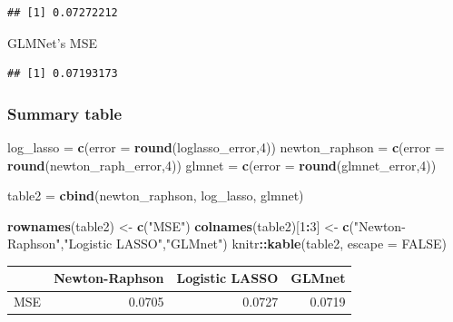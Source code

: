 \documentclass[]{article}
\newenvironment{Shaded}{\begin{snugshade}}{\end{snugshade}}
\newcommand{\KeywordTok}[1]{\textcolor[rgb]{0.13,0.29,0.53}{\textbf{#1}}}
\newcommand{\DataTypeTok}[1]{\textcolor[rgb]{0.13,0.29,0.53}{#1}}
\newcommand{\DecValTok}[1]{\textcolor[rgb]{0.00,0.00,0.81}{#1}}
\newcommand{\StringTok}[1]{\textcolor[rgb]{0.31,0.60,0.02}{#1}}
\newcommand{\OtherTok}[1]{\textcolor[rgb]{0.56,0.35,0.01}{#1}}
\newcommand{\OperatorTok}[1]{\textcolor[rgb]{0.81,0.36,0.00}{\textbf{#1}}}
\newcommand{\NormalTok}[1]{#1}
\begin{document}
\begin{verbatim}
## [1] 0.07272212
\end{verbatim}

GLMNet's MSE

\begin{Shaded}
\end{Shaded}

\begin{verbatim}
## [1] 0.07193173
\end{verbatim}

\subsubsection{Summary table}\label{summary-table}

\begin{Shaded}
\begin{Highlighting}[]
\NormalTok{log_lasso =}\StringTok{ }\KeywordTok{c}\NormalTok{(}\DataTypeTok{error =} \KeywordTok{round}\NormalTok{(loglasso_error,}\DecValTok{4}\NormalTok{))}
\NormalTok{newton_raphson =}\StringTok{ }\KeywordTok{c}\NormalTok{(}\DataTypeTok{error =} \KeywordTok{round}\NormalTok{(newton_raph_error,}\DecValTok{4}\NormalTok{))}
\NormalTok{glmnet =}\StringTok{ }\KeywordTok{c}\NormalTok{(}\DataTypeTok{error =} \KeywordTok{round}\NormalTok{(glmnet_error,}\DecValTok{4}\NormalTok{))}

\NormalTok{table2 =}\StringTok{ }\KeywordTok{cbind}\NormalTok{(newton_raphson, log_lasso, glmnet)}

\KeywordTok{rownames}\NormalTok{(table2) <-}\StringTok{ }\KeywordTok{c}\NormalTok{(}\StringTok{"MSE"}\NormalTok{)}
\KeywordTok{colnames}\NormalTok{(table2)[}\DecValTok{1}\OperatorTok{:}\DecValTok{3}\NormalTok{] <-}\StringTok{ }\KeywordTok{c}\NormalTok{(}\StringTok{"Newton-Raphson"}\NormalTok{,}\StringTok{"Logistic LASSO"}\NormalTok{,}\StringTok{"GLMnet"}\NormalTok{) }
\NormalTok{knitr}\OperatorTok{::}\KeywordTok{kable}\NormalTok{(table2, }\DataTypeTok{escape =} \OtherTok{FALSE}\NormalTok{)}
\end{Highlighting}
\end{Shaded}

\begin{longtable}[]{@{}lrrr@{}}
\toprule
& Newton-Raphson & Logistic LASSO & GLMnet\tabularnewline
\midrule
\endhead
MSE & 0.0705 & 0.0727 & 0.0719\tabularnewline
\bottomrule
\end{longtable}
\end{document}
